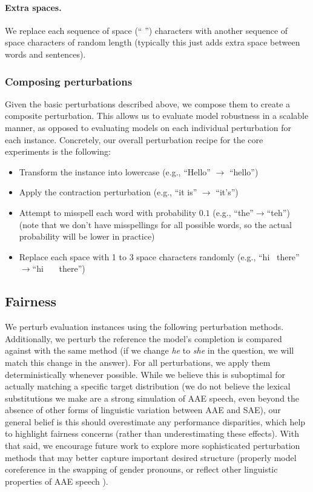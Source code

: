 \paragraph{Extra spaces.} We replace each sequence of space (`` '') characters with another sequence of space characters of random length (typically this just adds extra space between words and sentences).

\subsubsection{Composing perturbations}
Given the basic perturbations described above, we compose them to create a composite perturbation. This allows us to evaluate model robustness in a scalable manner, as opposed to evaluating models on each individual perturbation for each instance. Concretely, our overall perturbation recipe for the core experiments is the following:
\begin{itemize}
    \item Transform the instance into lowercase (e.g., ``Hello'' $\to$ ``hello'')
    \item Apply the contraction perturbation (e.g., ``it is'' $\to$ ``it's'')
    \item Attempt to misspell each word with probability $0.1$ (e.g., ``the''$\to$``teh'') (note that we don't have misspellings for all possible words, so the actual probability will be lower in practice)
    \item Replace each space with 1 to 3 space characters randomly (e.g., ``hi \textvisiblespace\ there''$\to$``hi \textvisiblespace\ \textvisiblespace\  \textvisiblespace\ there'')
\end{itemize}

\subsection{Fairness}
\label{app:perturbations-fairness}

We perturb evaluation instances using the following perturbation methods.
Additionally, we perturb the reference the model's completion is compared against with the same method (\eg if we change \textit{he} to \textit{she} in the question, we will match this change in the answer).
For all perturbations, we apply them deterministically whenever possible.
While we believe this is suboptimal for actually matching a specific target distribution (\eg we do not believe the lexical substitutions we make are a strong simulation of AAE speech, even beyond the absence of other forms of linguistic variation between AAE and SAE), our general belief is this should overestimate any performance disparities, which help to highlight fairness concerns (rather than underestimating these effects). 
With that said, we encourage future work to explore more sophisticated perturbation methods that may better capture important desired structure (\eg properly model coreference in the swapping of gender pronouns, or reflect other linguistic properties of AAE speech \citep{ziems2022value}). 

